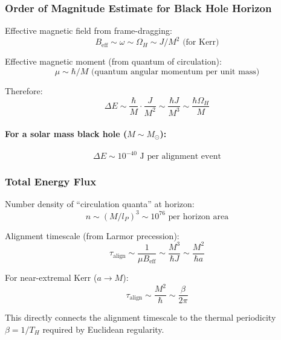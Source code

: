 \subsubsection{Order of Magnitude Estimate for Black Hole Horizon}

Effective magnetic field from frame-dragging:
\begin{equation}
B_{\text{eff}} \sim \omega \sim \Omega_H \sim J/M^2 \text{ (for Kerr)}
\end{equation}

Effective magnetic moment (from quantum of circulation):
\begin{equation}
\mu \sim \hbar/M \text{ (quantum angular momentum per unit mass)}
\end{equation}

Therefore:
\begin{equation}
\Delta E \sim \frac{\hbar}{M} \cdot \frac{J}{M^2} \sim \frac{\hbar J}{M^3} \sim \frac{\hbar \Omega_H}{M}
\end{equation}

\paragraph{For a solar mass black hole ($M \sim M_\odot$):}
\begin{equation}
\Delta E \sim 10^{-40} \text{ J per alignment event}
\end{equation}

\subsubsection{Total Energy Flux}

Number density of ``circulation quanta'' at horizon:
\begin{equation}
n \sim (M/l_P)^3 \sim 10^{76} \text{ per horizon area}
\end{equation}

Alignment timescale (from Larmor precession):
\begin{equation}
\tau_{\text{align}} \sim \frac{1}{\mu B_{\text{eff}}} \sim \frac{M^3}{\hbar J} \sim \frac{M^2}{\hbar a}
\end{equation}

For near-extremal Kerr ($a \to M$):
\begin{equation}
\tau_{\text{align}} \sim \frac{M^2}{\hbar} \sim \frac{\beta}{2\pi}
\end{equation}

This directly connects the alignment timescale to the thermal periodicity $\beta = 1/T_H$ required by Euclidean regularity.

